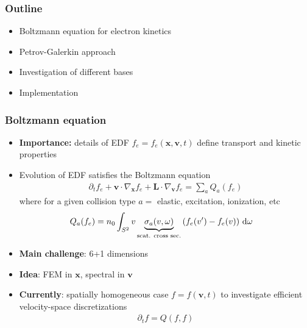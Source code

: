 \documentclass[mathserif, aspectratio=169]{beamer}
\newcommand{\ud}{\,\mathrm{d}}
\newcommand{\vect}[1]{\boldsymbol{#1}}
\begin{document}
\begin{frame}
\frametitle{Outline}
\begin{itemize}
  \item Boltzmann equation for electron kinetics
  \item Petrov-Galerkin approach
  \item Investigation of different bases
  \item Implementation 
\end{itemize}
\end{frame}

\begin{frame}
\frametitle{Boltzmann equation}
%
\begin{itemize}
\item \textbf{Importance:} details of EDF $f_e = f_e(\vect{x}, \vect{v}, t)$ define transport and kinetic properties
\item Evolution of EDF satisfies the Boltzmann equation
\small
\begin{align*}
\partial_t f_e + \vect{v}\cdot \nabla_{\vect{x}} f_e  + \vect{L} \cdot \nabla_{\vect{v }}f_e = \sum_{a} Q_a(f_e)
\end{align*}
where for a given collision type $a=$ elastic, excitation, ionization, etc
\begin{align*}
Q_a(f_e) &= n_0\int_{S^2} v \underbrace{\sigma_a(v,\omega)}_{\tiny\text{scat. cross sec.}} 
\left( f_e(v^\prime) - f_e(v) \right) \ud \omega 
\end{align*}
\item \textbf{Main challenge}: 6+1 dimensions
\item \textbf{Idea}: FEM in $\vect{x}$, spectral in $\vect{v}$
\item \textbf{Currently}: spatially homogeneous case $f = f(\vect{v}, t)$ to investigate efficient velocity-space discretizations
\begin{align*}
\partial_t f = Q(f,f)
\end{align*}
\end{itemize}
%
\end{frame}
%
\end{document}

